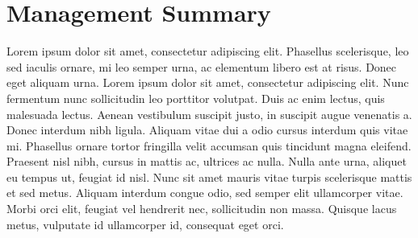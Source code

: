 \chapter*{Management Summary}
\label{chap:managementSummary}

Lorem ipsum dolor sit amet, consectetur adipiscing elit. Phasellus scelerisque, leo sed iaculis ornare, mi leo semper urna, ac elementum libero est at risus. Donec eget aliquam urna. Lorem ipsum dolor sit amet, consectetur adipiscing elit. Nunc fermentum nunc sollicitudin leo porttitor volutpat. Duis ac enim lectus, quis malesuada lectus. Aenean vestibulum suscipit justo, in suscipit augue venenatis a. Donec interdum nibh ligula. Aliquam vitae dui a odio cursus interdum quis vitae mi. Phasellus ornare tortor fringilla velit accumsan quis tincidunt magna eleifend. Praesent nisl nibh, cursus in mattis ac, ultrices ac nulla. Nulla ante urna, aliquet eu tempus ut, feugiat id nisl. Nunc sit amet mauris vitae turpis scelerisque mattis et sed metus. Aliquam interdum congue odio, sed semper elit ullamcorper vitae. Morbi orci elit, feugiat vel hendrerit nec, sollicitudin non massa. Quisque lacus metus, vulputate id ullamcorper id, consequat eget orci. 
